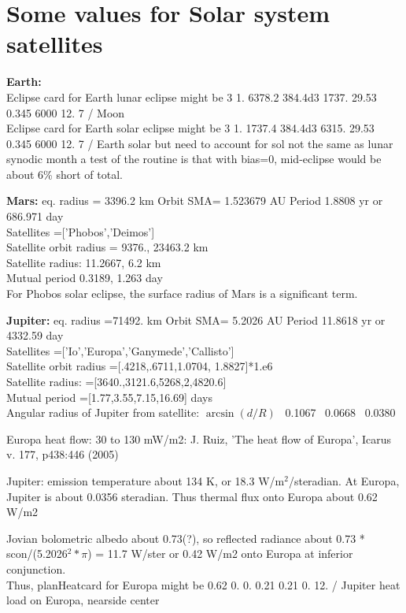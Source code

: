 \documentclass{article}
\begin{document}
\section{Some values for Solar system satellites \label{nomp}}

\textbf{Earth:} 
\\ Eclipse card for Earth lunar eclipse might be
 3 1. 6378.2 384.4d3 1737. 29.53 0.345 6000 12. 7 / Moon
\\ Eclipse card for Earth solar eclipse might be
 3 1. 1737.4 384.4d3 6315. 29.53 0.345 6000 12. 7 / Earth solar
\qi but need to account for sol not the same as lunar synodic month
\qii a test of the routine is that with bias=0, mid-eclipse would be about 6\% short of total.

\textbf{Mars:} eq. radius = 3396.2 km
\qi Orbit SMA= 1.523679 AU
\qi Period 1.8808 yr or 686.971 day
\\ Satellites =['Phobos','Deimos']
\\ Satellite orbit radius = 9376.,  23463.2 km
\\ Satellite radius: 11.2667, 6.2   km 
\\ Mutual period  0.3189, 1.263   day
\\ For Phobos solar eclipse, the surface radius of Mars is a significant term.

\textbf{Jupiter:} eq. radius =71492. km
\qi Orbit SMA= 5.2026 AU
\qi Period 11.8618 yr or 4332.59 day
\\ Satellites =['Io','Europa','Ganymede','Callisto']
\\ Satellite orbit radius =[.4218,.6711,1.0704, 1.8827]*1.e6
\\ Satellite radius: =[3640.,3121.6,5268,2,4820.6]
\\ Mutual period =[1.77,3.55,7.15,16.69] days
\\ Angular radius of Jupiter from satellite: $\arcsin(d/R)$
  \   0.1067 \   0.0668  \  0.0380

Europa heat flow: 30 to 130 mW/m2: J. Ruiz, 'The heat flow of Europa', Icarus v. 177, p438:446 (2005) 

Jupiter: emission temperature about 134 K, or 18.3 W/m$^2$/steradian. 
\qi At Europa, Jupiter is about 0.0356 steradian. 
\qi Thus thermal flux onto Europa about 0.62 W/m2

Jovian bolometric albedo about 0.73(?),
so reflected radiance about  0.73 * scon/(5.2026$^2*\pi$) = 11.7 W/ster
\qi or 0.42 W/m2 onto Europa at inferior conjunction. 
\\ Thus, planHeatcard for Europa might be
  0.62 0. 0.  0.21 0.21  0.  12. / Jupiter heat load on Europa, nearside center
\end{document}
